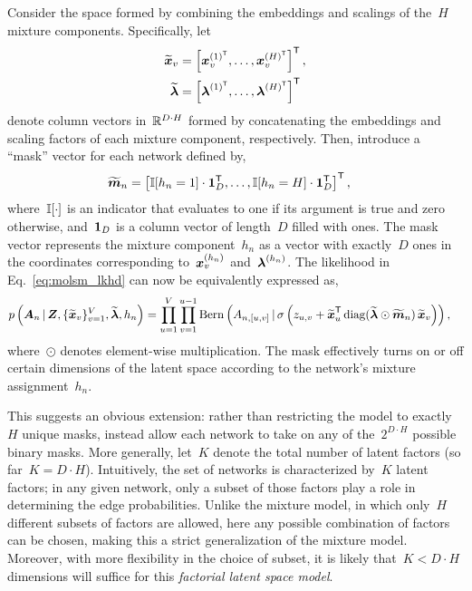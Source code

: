 Consider the space formed by combining the embeddings and scalings of
the~$H$ mixture components.  Specifically, let
\begin{align}
  \widetilde{\boldsymbol{x}}_v &= \left[\boldsymbol{x}_v^{(1)^{\mathsf{T}}}, \ldots, \boldsymbol{x}_v^{(H)^{\mathsf{T}}}\right]^{\mathsf{T}}, \\
  \widetilde{\boldsymbol{\lambda}} &= \left[\boldsymbol{\lambda}^{(1)^{\mathsf{T}}}, \ldots, \boldsymbol{\lambda}^{(H)^{\mathsf{T}}} \right]^{\mathsf{T}}
\end{align}
denote column vectors in~$\mathbb{R}^{D \cdot H}$ formed by concatenating the
embeddings and scaling factors of each mixture component, respectively.
Then, introduce a ``mask'' vector for each network defined by,
\begin{align}
  \widetilde{\boldsymbol{m}}_n &= \left[ \mathbb{I}[h_n=1] \cdot \boldsymbol{1}_D^{\mathsf{T}}, \ldots, \mathbb{I}[h_n=H] \cdot \boldsymbol{1}_D^{\mathsf{T}} \right]^{\mathsf{T}},
\end{align}
where~$\mathbb{I}[\cdot]$ is an indicator that evaluates to one if its
argument is true and zero otherwise, and~$\boldsymbol{1}_D$ is a column vector
of length~$D$ filled with ones. The mask vector represents
the mixture component~$h_n$ as a
vector with exactly~$D$ ones in the coordinates corresponding
to~$\boldsymbol{x}_v^{(h_n)}$ and~$\boldsymbol{\lambda}^{(h_n)}$. The likelihood in Eq.~\eqref{eq:molsm_lkhd} can now
be equivalently expressed as,
\begin{align}
  p \left(\boldsymbol{A}_n \, | \,
  \boldsymbol{Z}, \{\widetilde{\boldsymbol{x}}_v\}_{v=1}^V,
  \widetilde{\boldsymbol{\lambda}}, h_n \right) 
  &= \prod_{u=1}^V \prod_{v=1}^{u-1}
  \mathrm{Bern} \left(A_{n,[u,v]} \, | \,
    \sigma \left(z_{u,v} + \widetilde{\boldsymbol{x}}_{u}^{\mathsf{T}}
    \operatorname{diag}(\widetilde{\boldsymbol{\lambda}} \odot \widetilde{\boldsymbol{m}}_n) \,
    \widetilde{\boldsymbol{x}}_v \right) \right),
\end{align}
where~$\odot$ denotes element-wise multiplication. The mask effectively
turns on or off certain dimensions of the latent space according to
the network's mixture assignment~$h_n$.

This suggests an obvious extension: rather than restricting the model
to exactly~$H$ unique masks, instead allow each network to take on any
of the~$2^{D \cdot H}$ possible binary masks. More generally, let~$K$
denote the total number of latent factors (so far~${K=D \cdot
  H}$). Intuitively, the set of networks is characterized by~$K$
latent factors; in any given network, only a subset of those factors
play a role in determining the edge probabilities. Unlike the mixture
model, in which only~$H$ different subsets of factors are allowed, here any
possible combination of factors can be chosen, making this a strict
generalization of the mixture model.  Moreover, with more flexibility
in the choice of subset, it is likely that~${K < D \cdot H}$
dimensions will suffice for this \emph{factorial latent space model}.


